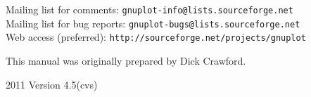 \documentclass[twoside]{article}
\begin{document}
\begin{center}
  \vspace{2ex}

  Mailing list for comments: \verb+gnuplot-info@lists.sourceforge.net+\\
  Mailing list for bug reports: \verb+gnuplot-bugs@lists.sourceforge.net+\\
  Web access (preferred): \verb+http://sourceforge.net/projects/gnuplot+

  \vfill
  This manual was originally prepared by Dick Crawford. \\

  \vspace{2ex}

 2011  Version 4.5(cvs)

   \end{center}
\newpage


\hypertarget{TableOfContents}{}
\tableofcontents

\newpage
\end{document}
